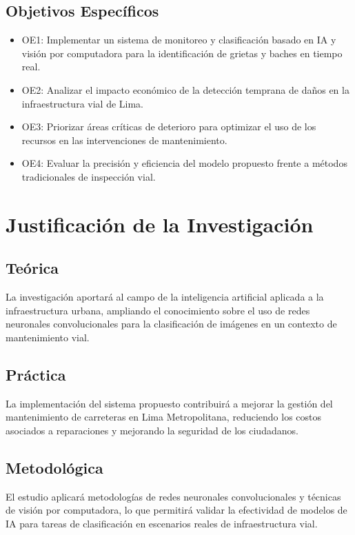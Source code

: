 	\subsection{Objetivos Específicos}
	\newcommand{\Objone}{
	Implementar un sistema de monitoreo y clasificación basado en IA y visión por computadora para la identificación de grietas y baches en tiempo real.
	}
	\newcommand{\Objtwo}{
	Analizar el impacto económico de la detección temprana de daños en la infraestructura vial de Lima.
	}
	\newcommand{\Objthree}{
	Priorizar áreas críticas de deterioro para optimizar el uso de los recursos en las intervenciones de mantenimiento.
	}
	\newcommand{\Objfour}{
	Evaluar la precisión y eficiencia del modelo propuesto frente a métodos tradicionales de inspección vial.
	}

	\begin{itemize}
		\item OE1: {\Objone}
		\item OE2: {\Objtwo}
		\item OE3: {\Objthree}
		\item OE4: {\Objfour}
	\end{itemize}

	\section{Justificación de la Investigación}

	\subsection{Teórica}
	La investigación aportará al campo de la inteligencia artificial aplicada a la infraestructura urbana, ampliando el conocimiento sobre el uso de redes neuronales convolucionales para la clasificación de imágenes en un contexto de mantenimiento vial.
	\subsection{Práctica}
	La implementación del sistema propuesto contribuirá a mejorar la gestión del mantenimiento de carreteras en Lima Metropolitana, reduciendo los costos asociados a reparaciones y mejorando la seguridad de los ciudadanos.
	\subsection{Metodológica}
	El estudio aplicará metodologías de redes neuronales convolucionales y técnicas de visión por computadora, lo que permitirá validar la efectividad de modelos de IA para tareas de clasificación en escenarios reales de infraestructura vial.
